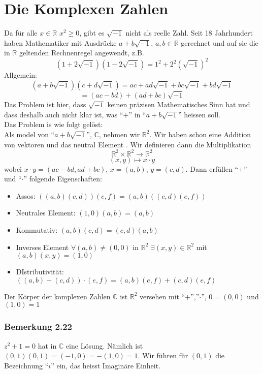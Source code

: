 \section{Die Komplexen Zahlen}
Da für alle $x\in\mathbb{R}$ $x^2\geq 0$, gibt es $\sqrt{-1}$ nicht als reelle Zahl. Seit 18 Jahrhundert haben Mathematiker mit Ausdrücke $a+b\sqrt{-1}$, $a,b\in\mathbb{R}$ gerechnet und auf sie die in $\mathbb{R}$ geltenden Rechnenregel angewendt, z.B. \[\left( 1+2\sqrt{-1}\right)\left( 1-2\sqrt{-1}\right) = 1^2 + 2^2\left( \sqrt{-1}\right)^2\]
Allgemein:
\[\left( a+b\sqrt{-1} \right)\left( c+d\sqrt{-1}\right) = ac + ad\sqrt{-1} + bc\sqrt{-1}+bd\sqrt{-1}\]
\[=\left( ac-bd\right)+\left(ad+bc\right)\sqrt{-1}\]
Das Problem ist hier, dass $\sqrt{-1}$ keinen präzisen Mathematisches Sinn hat und dass deshalb auch nicht klar ist, was ``$+$'' in ``$a+b\sqrt{-1}$'' heissen soll. \\

\noindent Das Problem is wie folgt gelöst:\\

Als model von ``$a+b\sqrt{-1}$'', $\mathbb{C}$, nehmen wir $\mathbb{R}^2$. Wir haben schon eine Addition von vektoren und das neutral Element . Wir definieren dann die Multiplikation \[\mathbb{R}^2 \times\mathbb{R}^2 \to \mathbb{R}^2\] \[(x,y)\mapsto x\cdot y \]
wobei $x\cdot y=(ac-bd,ad+bc)$, $x=(a,b)$, $y=(c,d)$. Dann erfüllen ``$+$'' und ``$\cdot$'' folgende Eigenschaften:
\begin{itemize}
\item Assos: $\left((a,b)(c,d)\right)(e,f)=(a,b)\left((c,d)(e,f) \right)$
\item Neutrales Element: $(1,0)(a,b)=(a,b)$
\item Kommutativ: $(a,b)(c,d)=(c,d)(a,b)$
\item Inverses Element $\forall (a,b)\not = (0,0)$ in $\mathbb{R}^2$ $\exists(x,y)\in\mathbb{R}^2$ mit $(a,b)(x,y)=(1,0)$
\item DIstributivität: $\left( (a,b)+(c,d)\right)\cdot (e,f)=(a,b)(e,f)+(c,d)(e,f)$
\end{itemize}

\begin{definition}{2.21}
Der Körper der komplexen Zahlen $\mathbb{C}$ ist $\mathbb{R}^2$ versehen mit ``$+$'',''$\cdot$'', $0=(0,0)$ und $(1,0)=1$
\end{definition}

\subsubsection*{Bemerkung 2.22}
$z^2+1=0$ hat in $\mathbb{C}$ eine Lösung. Nämlich ist $(0,1)(0,1)=(-1,0)=-(1,0)=1$. Wir führen für $(0,1)$ die Bezeichnung ``$i$'' ein, das heisst Imaginäre Einheit.\\

